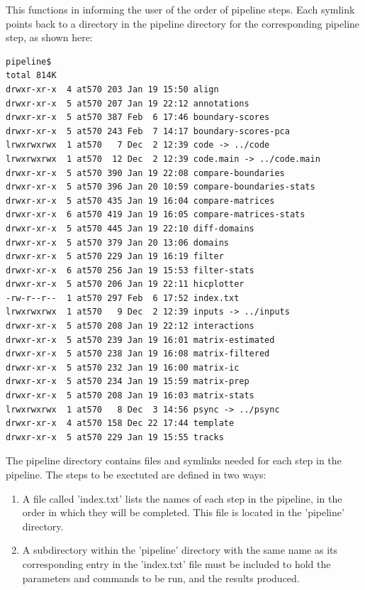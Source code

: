This functions in informing the user of the order of pipeline steps. Each symlink points back to a directory in the pipeline directory for the corresponding pipeline step, as shown here:


\begin{lstlisting}
pipeline$
total 814K
drwxr-xr-x  4 at570 203 Jan 19 15:50 align
drwxr-xr-x  5 at570 207 Jan 19 22:12 annotations
drwxr-xr-x  5 at570 387 Feb  6 17:46 boundary-scores
drwxr-xr-x  5 at570 243 Feb  7 14:17 boundary-scores-pca
lrwxrwxrwx  1 at570   7 Dec  2 12:39 code -> ../code
lrwxrwxrwx  1 at570  12 Dec  2 12:39 code.main -> ../code.main
drwxr-xr-x  5 at570 390 Jan 19 22:08 compare-boundaries
drwxr-xr-x  5 at570 396 Jan 20 10:59 compare-boundaries-stats
drwxr-xr-x  5 at570 435 Jan 19 16:04 compare-matrices
drwxr-xr-x  6 at570 419 Jan 19 16:05 compare-matrices-stats
drwxr-xr-x  5 at570 445 Jan 19 22:10 diff-domains
drwxr-xr-x  5 at570 379 Jan 20 13:06 domains
drwxr-xr-x  5 at570 229 Jan 19 16:19 filter
drwxr-xr-x  6 at570 256 Jan 19 15:53 filter-stats
drwxr-xr-x  5 at570 206 Jan 19 22:11 hicplotter
-rw-r--r--  1 at570 297 Feb  6 17:52 index.txt
lrwxrwxrwx  1 at570   9 Dec  2 12:39 inputs -> ../inputs
drwxr-xr-x  5 at570 208 Jan 19 22:12 interactions
drwxr-xr-x  5 at570 239 Jan 19 16:01 matrix-estimated
drwxr-xr-x  5 at570 238 Jan 19 16:08 matrix-filtered
drwxr-xr-x  5 at570 232 Jan 19 16:00 matrix-ic
drwxr-xr-x  5 at570 234 Jan 19 15:59 matrix-prep
drwxr-xr-x  5 at570 208 Jan 19 16:03 matrix-stats
lrwxrwxrwx  1 at570   8 Dec  3 14:56 psync -> ../psync
drwxr-xr-x  4 at570 158 Dec 22 17:44 template
drwxr-xr-x  5 at570 229 Jan 19 15:55 tracks
\end{lstlisting}

The pipeline directory contains files and symlinks needed for each step in the pipeline. The steps to be exectuted are defined in two ways:
\begin{enumerate}
\item A file called 'index.txt' lists the names of each step in the pipeline, in the order in which they will be completed. This file is located in the 'pipeline' directory. 
\item A subdirectory within the 'pipeline' directory with the same name as its corresponding entry in the 'index.txt' file must be included to hold the parameters and commands to be run, and the results produced. 
\end{enumerate}

